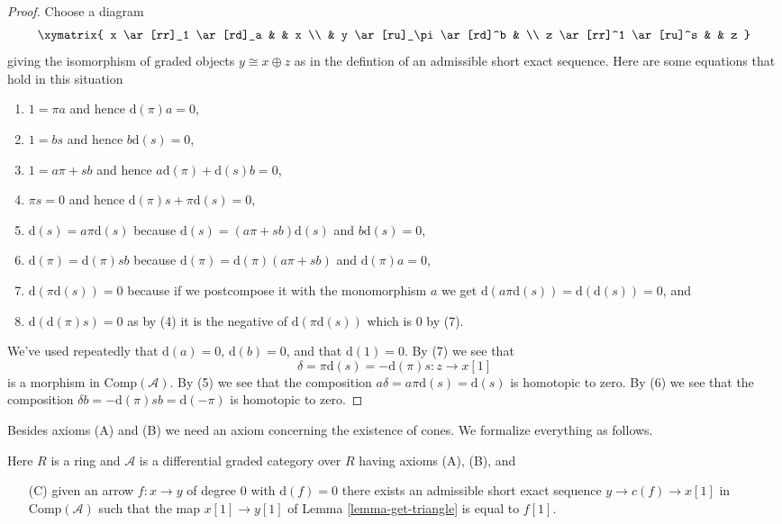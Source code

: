 \begin{proof}
Choose a diagram
$$
\xymatrix{
x \ar[rr]_1 \ar[rd]_a & & x \\
& y \ar[ru]_\pi \ar[rd]^b & \\
z \ar[rr]^1 \ar[ru]^s & & z
}
$$
giving the isomorphism of graded objects $y \cong x \oplus z$ as in the
defintion of an admissible short exact sequence. Here are some equations
that hold in this situation
\begin{enumerate}
\item $1 = \pi a$ and hence $\text{d}(\pi) a = 0$,
\item $1 = b s$ and hence $b \text{d}(s) = 0$,
\item $1 = a \pi + s b$ and hence $a \text{d}(\pi) + \text{d}(s) b = 0$,
\item $\pi s = 0$ and hence $\text{d}(\pi)s + \pi \text{d}(s) = 0$,
\item $\text{d}(s) = a \pi \text{d}(s)$ because
$\text{d}(s) = (a \pi + s b)\text{d}(s)$ and $b\text{d}(s) = 0$,
\item $\text{d}(\pi) = \text{d}(\pi) s b$ because
$\text{d}(\pi) = \text{d}(\pi)(a \pi + s b)$ and $\text{d}(\pi)a = 0$,
\item $\text{d}(\pi \text{d}(s)) = 0$ because if we postcompose it
with the monomorphism $a$ we get
$\text{d}(a\pi \text{d}(s)) = \text{d}(\text{d}(s)) = 0$, and
\item $\text{d}(\text{d}(\pi)s) = 0$ as by (4) it is the negative
of $\text{d}(\pi\text{d}(s))$ which is $0$ by (7).
\end{enumerate}
We've used repeatedly that $\text{d}(a) = 0$, $\text{d}(b) = 0$,
and that $\text{d}(1) = 0$. By (7) we see that
$$
\delta = \pi \text{d}(s) = - \text{d}(\pi) s : z \to x[1]
$$
is a morphism in $\text{Comp}(\mathcal{A})$. By (5) we see that
the composition $a \delta = a \pi \text{d}(s) = \text{d}(s)$
is homotopic to zero. By (6) we see that the composition
$\delta b = - \text{d}(\pi)sb = \text{d}(-\pi)$ is homotopic to zero.
\end{proof}

\noindent
Besides axioms (A) and (B) we need an axiom concerning the existence of
cones. We formalize everything as follows.

\begin{situation}
\label{situation-ABC}
Here $R$ is a ring and $\mathcal{A}$ is a differential graded category
over $R$ having axioms (A), (B), and
\begin{enumerate}
\item[(C)] given an arrow $f : x \to y$ of degree $0$ with
$\text{d}(f) = 0$ there exists an admissible short exact sequence
$y \to c(f) \to x[1]$ in $\text{Comp}(\mathcal{A})$ such that the map
$x[1] \to y[1]$ of Lemma \ref{lemma-get-triangle} is equal to $f[1]$.
\end{enumerate}
\end{situation}

